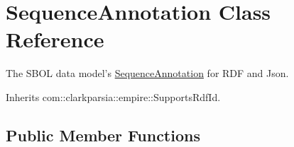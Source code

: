 \hypertarget{classorg_1_1sbolstandard_1_1lib_s_b_o_lj_1_1_sequence_annotation}{
\section{SequenceAnnotation Class Reference}
\label{classorg_1_1sbolstandard_1_1lib_s_b_o_lj_1_1_sequence_annotation}
}


The SBOL data model's \hyperlink{classorg_1_1sbolstandard_1_1lib_s_b_o_lj_1_1_sequence_annotation}{SequenceAnnotation} for RDF and Json.  




Inherits com::clarkparsia::empire::SupportsRdfId.

\subsection*{Public Member Functions}

